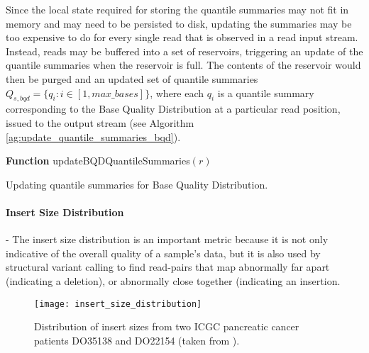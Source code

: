 Since the local state required for storing the quantile summaries may not fit in memory and may need to be persisted to disk, updating the summaries may be too expensive to do for every single read that is observed in a read input stream. Instead, reads may be buffered into a set of reservoirs, triggering an update of the quantile summaries when the reservoir is full. The contents of the reservoir would then be purged and an updated set of quantile summaries $Q_{s,{bqd}} = \{q_i: i\in [1,max\_bases]\}$, where each $q_i$ is a quantile summary corresponding to the Base Quality Distribution at a particular read position, issued to the output stream (see Algorithm \ref{ag:update_quantile_summaries_bqd}).

\begin{algorithm2e}[h]
\DontPrintSemicolon
\footnotesize
    \textbf{Function} {\sc updateBQDQuantileSummaries}$(r)$
\caption{Updating quantile summaries for Base Quality Distribution.}
\label{ag:update_quantile_summaries_bqd}
\end{algorithm2e}

\paragraph{Insert Size Distribution} - The insert size distribution is an important metric because it is not only indicative of the overall quality of a sample's data, but it is also used by structural variant calling to find read-pairs that map abnormally far apart (indicating a deletion), or abnormally close together (indicating an insertion. 

\begin{figure}[H]
    \texttt{[image: insert\_size\_distribution]}
    \centering
    \caption {Distribution of insert sizes from two ICGC pancreatic cancer patients DO35138 and DO22154 (taken from \autocite{stephens2016simulating}).}
    \label{fig:insert_size_distribution}
\end{figure} 

